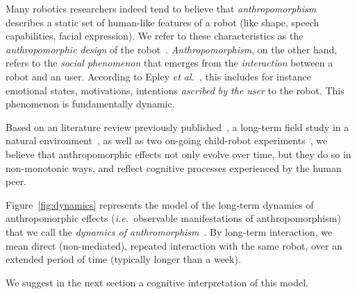 \documentclass{sig-alternate-2013}
\newcommand{\etal}{{\textit{et al.~}}}
\newcommand{\ie}{{\textit{i.e.~}}}
\begin{document}
Many robotics researchers indeed tend to believe that \emph{anthropomorphism}
describes a static set of human-like features of a robot (like shape, speech
capabilities, facial expression). We refer to these characteristics as the
\emph{anthropomorphic design} of the robot~\cite{fink_anthropomorphism_2012}.
\emph{Anthropomorphism}, on the other hand, refers to the \emph{social
phenomenon} that emerges from the \emph{interaction} between a robot and an
user. According to Epley \etal\cite{epley_when_2008}, this includes for
instance emotional states, motivations, intentions \emph{ascribed by the user}
to the robot. This phenomenon is fundamentally dynamic.

Based on an literature review previously
published~\cite{fink_anthropomorphism_2012}, a long-term field study in a
natural environment~\cite{fink_living_2013}, as well as two on-going child-robot
experiments~\cite{fink2014which}, we believe that anthropomorphic effects not
only evolve over time, but they do so in non-monotonic ways, and reflect
cognitive processes experienced by the human peer.

Figure~\ref{fig:dynamics} represents the model of the long-term dynamics of
anthropomorphic effects (\ie observable manifestations of anthropomorphism) that
we call the \emph{dynamics of anthromorphism}~\cite{lemaignan2014dynamics}. By
long-term interaction, we mean direct (non-mediated), repeated interaction with
the same robot, over an extended period of time (typically longer than a week).

We suggest in the next section a cognitive interpretation of this model.
\end{document}
